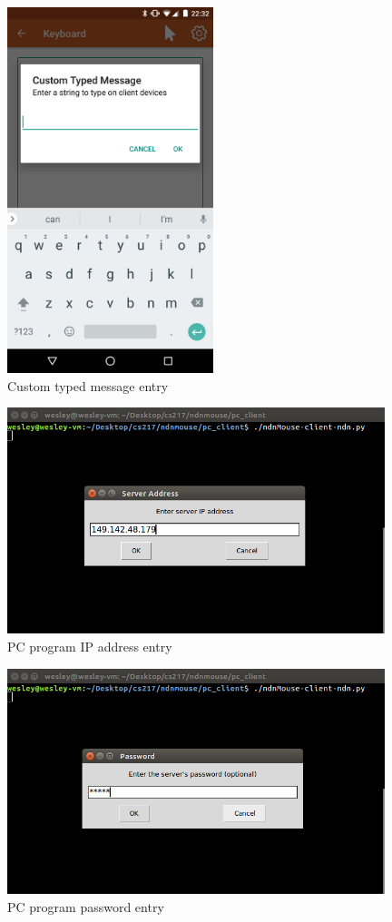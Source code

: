 \documentclass{sig-alternate}
\renewcommand\_{\textunderscore\allowbreak}  %
\begin{document}
\begin{figure}[hp]
	\hypertarget{fig:custom\_type\_message}{}
	\centering
	\includegraphics[width=6cm]{screenshots/custom_type_message}
	\caption{Custom typed message entry}
\end{figure}

\begin{figure}[hp]
	\hypertarget{fig:client1}{}
	\centering
	\includegraphics[width=11cm]{screenshots/client1}
	\caption{PC program IP address entry}
\end{figure}

\begin{figure}[hp]
	\hypertarget{fig:client2}{}
	\centering
	\includegraphics[width=11cm]{screenshots/client2}
	\caption{PC program password entry}
\end{figure}
\end{document}
